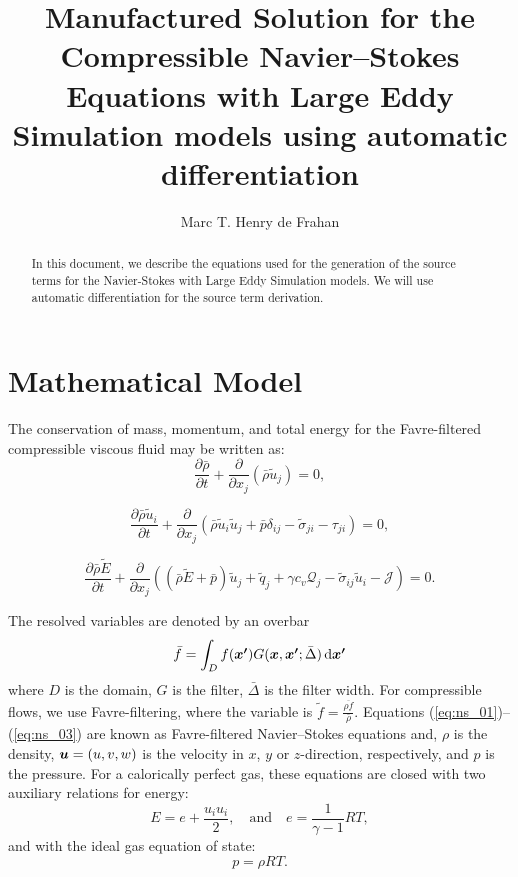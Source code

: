 \documentclass[10pt]{article}
\title{Manufactured Solution for the Compressible Navier--Stokes Equations with Large Eddy Simulation models using automatic differentiation}
\author{Marc T. Henry de Frahan}
\newcommand{\bv}[1]{\ensuremath{\mbox{\boldmath$ #1 $}}}
\newcommand{\pfrac}[2]{\frac{\partial#1}{\partial#2}}
\newcommand{\wt}[1]{\widetilde{#1}}
\newcommand{\ud}{\,\mathrm{d}}
\begin{document}
\maketitle

\begin{abstract}
  In this document, we describe the equations used for the generation
  of the source terms for the Navier-Stokes with Large Eddy Simulation
  models. We will use automatic differentiation for the source term
  derivation.
\end{abstract}

\section{Mathematical Model}
The conservation of mass, momentum, and total energy for the Favre-filtered compressible viscous fluid may be written as:
\begin{equation}
  \label{eq:ns_01}
  \pfrac{\bar{\rho}}{t} + \pfrac{}{x_j}\left( \bar{\rho} \wt{u}_j \right) = 0,
\end{equation}

\begin{equation}
  \label{eq:ns_02}
  \pfrac{\bar{\rho} \wt{u}_i}{t} + \pfrac{}{x_j}\left( \bar{\rho} \wt{u}_i \wt{u}_j + \bar{p} \delta_{ij} - \wt{\sigma}_{ji} - \tau_{ji} \right) = 0,
\end{equation}

\begin{equation}
  \label{eq:ns_03}
  \pfrac{\bar{\rho} \wt{E}}{t} + \pfrac{}{x_j}\left( \left(\bar{\rho} \wt{E} + \bar{p}\right) \wt{u}_j + \wt{q}_j + \gamma c_v \mathcal{Q}_j - \wt{\sigma}_{ij} \wt{u}_i - \mathcal{J} \right) = 0.
\end{equation}

The resolved variables are denoted by an overbar
\begin{equation}
  \bar{f} = \int_D f(\bv{x'}) G(\bv{x}, \bv{x'}; \bar{\Delta}) \ud \bv{x'}
\end{equation}
where $D$ is the domain, $G$ is the filter, $\bar{\Delta}$ is the
filter width. For compressible flows, we use Favre-filtering, where
the variable is $\wt{f} = \frac{\overline{\rho f}}{\bar{\rho}}$.
Equations (\ref{eq:ns_01})--(\ref{eq:ns_03}) are known as
Favre-filtered Navier--Stokes equations and, $\rho$ is the density,
$\bv{u}=(u,v,w)$ is the velocity in $x$, $y$ or $z$-direction,
respectively, and $p$ is the pressure. For a calorically perfect gas,
these equations are closed with two auxiliary relations for energy:
\begin{equation}
  \label{eq:ns_04}
  E = e + \dfrac{u_i u_i}{2},\quad\mbox{and}\quad e=\dfrac{1}{\gamma -1}RT ,
\end{equation}
and with the ideal gas equation of state:
\begin{equation}
  \label{eq:ns_05}
  p=\rho RT.
\end{equation}
\end{document}
